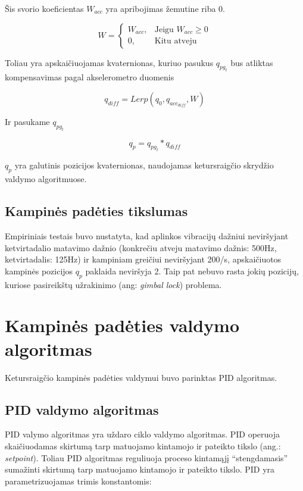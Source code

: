 \documentclass[12pt, a4paper, lithuanian, final]{article}
\begin{document}
Šis svorio koeficientas $W_{acc}$ yra apribojimas žemutine riba 0.

\begin{equation}
	W = \begin{cases}
		W_{acc}, & \text{Jeigu } W_{acc} \geq 0\\
		0, & \text{Kitu atveju}
	\end{cases}
\end{equation}


Toliau yra apskaičiuojamas kvaternionas, kuriuo pasukus $q_{pg_t}$ bus atliktas kompensavimas pagal akselerometro duomenis

\begin{equation}
	q_{diff} = Lerp(q_{0}, q_{acc_{diff}}, W)
\end{equation}

Ir pasukame $q_{pg_t}$

\begin{equation}
	q_{p} = q_{pg_t} * q_{diff}
\end{equation}

$q_{p}$ yra galutinis pozicijos kvaternionas, naudojamas ketursraigčio skrydžio valdymo algoritmuose.

\subsection{Kampinės padėties tikslumas}
Empiriniais testais buvo nustatyta, kad aplinkos vibracijų dažniui neviršyjant ketvirtadalio matavimo dažnio (konkrečiu atveju matavimo dažnis: 500Hz, ketvirtadalis: 125Hz) ir kampiniam greičiui neviršyjant 200\degree/s, apskaičiuotos kampinės pozicijos $q_{p}$ paklaida neviršyja 2\degree.
Taip pat nebuvo rasta jokių pozicijų, kuriose pasireikštų užrakinimo (ang: \textit{gimbal lock}) problema.




\section{Kampinės padėties valdymo algoritmas}
\label{skyr-attitudeCtrl}

Ketursraigčio kampinės padėties valdymui buvo parinktas PID algoritmas.

\subsection{PID valdymo algoritmas}

PID valymo algoritmas yra uždaro ciklo valdymo algoritmas.
PID operuoja skaičiuodamas skirtumą tarp matuojamo kintamojo ir pateikto tikslo (ang.: \textit{setpoint}).
Toliau PID algoritmas reguliuoja proceso kintamąjį "`stengdamasis"' sumažinti skirtumą tarp matuojamo kintamojo ir pateikto tikslo.
PID yra parametrizuojamas trimis konstantomis:
\end{document}
